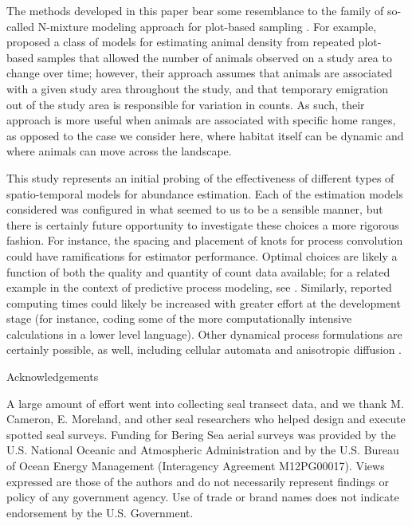 \documentclass[12pt,english]{article}
\begin{document}
\begin{spacing}{1.9}
The methods developed in this paper bear some resemblance to the family of so-called N-mixture modeling approach for plot-based sampling \citep{Royle2004}.  For example, \citet{ChandlerEtAl2011} proposed a class of models for estimating animal density from repeated plot-based samples that allowed the number of animals observed on a study area to change over time; however, their approach assumes that animals are associated with a given study area throughout the study, and that temporary emigration out of the study area is responsible for variation in counts.  As such, their approach is more useful when animals are associated with specific home ranges, as opposed to the case we consider here, where habitat itself can be dynamic and where animals can move across the landscape.

This study represents an initial probing of the effectiveness of different types of spatio-temporal models for abundance estimation.  Each of the estimation models considered was configured in what seemed to us to be a sensible manner, but there is certainly future opportunity to investigate these choices a more rigorous fashion.  For instance, the spacing and placement of knots for process convolution could have ramifications for estimator performance. Optimal choices are likely a function of both the quality and quantity of count data available; for a related example in the context of predictive process modeling, see \citet{FinleyEtAl2009}.  Similarly, reported computing times could likely be increased with greater effort at the development stage (for instance, coding some of the more computationally intensive calculations in a lower level language).  Other dynamical process formulations are certainly possible, as well, including cellular automata \citep{HootenWikle2010} and anisotropic diffusion \citep[see e.g.,][]{WikleEtAl2001}.


\centerline{\sc Acknowledgements} A large amount of effort went into collecting seal transect data, and we thank M. Cameron, E. Moreland, and other seal researchers who helped design and execute spotted seal surveys.  Funding
for Bering Sea aerial surveys was provided by the U.S. National Oceanic and Atmospheric
Administration and by the U.S. Bureau of Ocean Energy Management (Interagency
Agreement M12PG00017).  Views expressed are those of the authors and do not necessarily represent findings or policy of any government agency.  Use of trade or brand names does not indicate endorsement by the U.S. Government.

\renewcommand{\refname}{Literature Cited}



\end{spacing}
\end{document}
